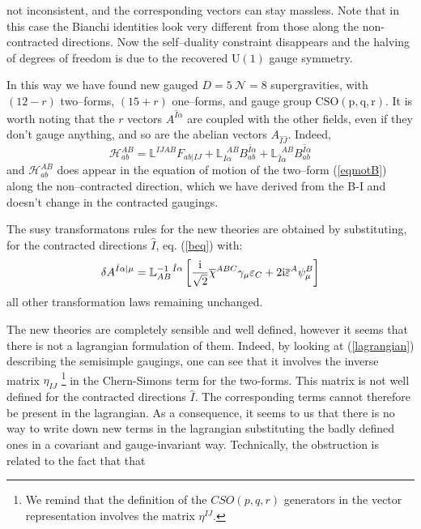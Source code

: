 \documentclass[a4paper,12pt]{article}
\def\bar{\overline}\end {picture}}
\begin{document}
not inconsistent, and the corresponding vectors can stay massless.
Note that in this case the Bianchi identities look very different
from those along the non-contracted directions. Now the
self--duality constraint disappears and the halving of degrees of
freedom is due to the recovered $\mathrm{U(1)}$ gauge symmetry.
\par
In this way we have found new gauged $D=5~\mathcal{N}=8$
supergravities, with $(12-r)$ two--forms, $(15+r)$ one--forms, and
gauge group $\mathrm{CSO}\mathrm{(p,q,r)}$. It is worth noting
that the $r$ vectors $A^{\hat{I}\alpha}$ are coupled with the
other fields, even if they don't gauge anything, and so are the
abelian  vectors $A_{\hat{I}\hat{J}}$. Indeed,
\begin{equation}
\mathcal{H}^{AB}_{ab}=\mathbb{L}^{IJAB}F_{ab\vert IJ}+
\mathbb{L}_{\bar{I}\alpha}^{~~AB}B^{\bar{I}\alpha}_{ab}+
\mathbb{L}_{\hat{I}\alpha}^{~~AB}B^{\hat{I}\alpha}_{ab}
\end{equation}
and $\mathcal{H}^{AB}_{ab}$ does appear in the equation of motion
of the two--form (\ref{eqmotB}) along the non--contracted
direction, which we have derived from the B-I and doesn't change
in the contracted gaugings.
\par
The susy transformatons rules for the new theories are obtained by
substituting, for the contracted directions $\hat I$, eq.
(\ref{beq}) with:
\begin{equation}
\delta A^{\hat I\alpha|\mu} = \mathbb{L}^{-1~\hat
I\alpha}_{AB}\left[ {{\rm i}\over\sqrt{2}}
\bar{\chi}^{ABC}\gamma_\mu\varepsilon_C +2{\rm
i}\bar\varepsilon^A\psi^B_\mu \right]
\end{equation}
 all other transformation laws remaining unchanged.
 \par
 The new theories are completely sensible and well
 defined, however it seems that there is not a lagrangian formulation
 of them.
 Indeed, by looking at (\ref{lagrangian}) describing the semisimple
 gaugings, one can see that it involves the inverse matrix
 $\eta_{IJ}$ \footnote{We remind that the definition of the
$CSO(p,q,r)$ generators in the vector representation involves the
matrix $\eta^{IJ}$.} in the Chern-Simons term for the two-forms.
This matrix is not well defined for the contracted directions
$\hat I$. The corresponding terms cannot therefore be present in
the lagrangian. As a consequence, it seems to us that there is no
way to write down new terms in the lagrangian substituting the
badly defined ones in a covariant and gauge-invariant way.
Technically, the obstruction is related to the fact that that
\end{document}
